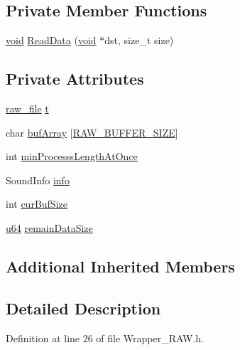 \subsection*{Private Member Functions}
\begin{DoxyCompactItemize}
\item 
\mbox{\hyperlink{_thread_8h_af1e856da2e658414cb2456cb6f7ebc66}{void}} \mbox{\hyperlink{classnjli_1_1_wrapper_raw_a0cb793500d35360b2c404e2d8f20ced4}{Read\+Data}} (\mbox{\hyperlink{_thread_8h_af1e856da2e658414cb2456cb6f7ebc66}{void}} $\ast$dst, size\+\_\+t size)
\end{DoxyCompactItemize}
\subsection*{Private Attributes}
\begin{DoxyCompactItemize}
\item 
\mbox{\hyperlink{structraw__file}{raw\+\_\+file}} \mbox{\hyperlink{classnjli_1_1_wrapper_raw_a7ba78d8632dbe232fd0daa2e95b4aa0f}{t}}
\item 
char \mbox{\hyperlink{classnjli_1_1_wrapper_raw_a3ab92988abb19e2d2c7ec7adf6766829}{buf\+Array}} \mbox{[}\mbox{\hyperlink{_wrapper___r_a_w_8h_aa2cdcb113ebceb066957c13a5bc9583f}{R\+A\+W\+\_\+\+B\+U\+F\+F\+E\+R\+\_\+\+S\+I\+ZE}}\mbox{]}
\item 
int \mbox{\hyperlink{classnjli_1_1_wrapper_raw_a3e14e31378663644b64aba5e9c70de89}{min\+Processs\+Length\+At\+Once}}
\item 
Sound\+Info \mbox{\hyperlink{classnjli_1_1_wrapper_raw_a777c10f85fa37e26f01338e5fa8bf938}{info}}
\item 
int \mbox{\hyperlink{classnjli_1_1_wrapper_raw_ab031228efdb332e48e741564b47c962e}{cur\+Buf\+Size}}
\item 
\mbox{\hyperlink{_util_8h_ad758b7a5c3f18ed79d2fcd23d9f16357}{u64}} \mbox{\hyperlink{classnjli_1_1_wrapper_raw_a99823dc02d8302ee759a206ac3263a6a}{remain\+Data\+Size}}
\end{DoxyCompactItemize}
\subsection*{Additional Inherited Members}


\subsection{Detailed Description}


Definition at line 26 of file Wrapper\+\_\+\+R\+A\+W.\+h.




